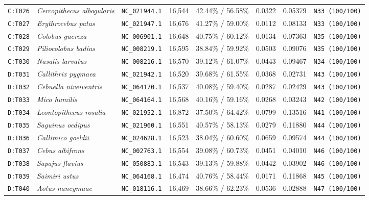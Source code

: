 \documentclass[10pt,letterpaper]{article}
\begin{document}
\begin{longtable}{llllllll}
\texttt{C:T026} & \textit{Cercopithecus albogularis} & \texttt{NC\_021944.1} & 16,544 & 42.44\% / 56.58\% & 0.0322 & 0.05379 & \texttt{N33 (100/100)} \\
\texttt{C:T027} & \textit{Erythrocebus patas} & \texttt{NC\_021947.1} & 16,676 & 41.27\% / 59.00\% & 0.0112 & 0.08133 & \texttt{N33 (100/100)} \\
\texttt{C:T028} & \textit{Colobus guereza} & \texttt{NC\_006901.1} & 16,648 & 40.75\% / 60.12\% & 0.0134 & 0.07363 & \texttt{N35 (100/100)} \\
\texttt{C:T029} & \textit{Piliocolobus badius} & \texttt{NC\_008219.1} & 16,595 & 38.84\% / 59.92\% & 0.0503 & 0.09076 & \texttt{N35 (100/100)} \\
\texttt{C:T030} & \textit{Nasalis larvatus} & \texttt{NC\_008216.1} & 16,570 & 39.12\% / 61.07\% & 0.0443 & 0.09467 & \texttt{N34 (100/100)} \\
\texttt{D:T031} & \textit{Callithrix pygmaea} & \texttt{NC\_021942.1} & 16,520 & 39.68\% / 61.55\% & 0.0368 & 0.02731 & \texttt{N43 (100/100)} \\
\texttt{D:T032} & \textit{Cebuella niveiventris} & \texttt{NC\_064170.1} & 16,537 & 40.08\% / 59.40\% & 0.0287 & 0.02429 & \texttt{N43 (100/100)} \\
\texttt{D:T033} & \textit{Mico humilis} & \texttt{NC\_064164.1} & 16,568 & 40.16\% / 59.16\% & 0.0268 & 0.03243 & \texttt{N42 (100/100)} \\
\texttt{D:T034} & \textit{Leontopithecus rosalia} & \texttt{NC\_021952.1} & 16,872 & 37.50\% / 64.42\% & 0.0799 & 0.13516 & \texttt{N41 (100/100)} \\
\texttt{D:T035} & \textit{Saguinus oedipus} & \texttt{NC\_021960.1} & 16,551 & 40.57\% / 58.13\% & 0.0279 & 0.11880 & \texttt{N44 (100/100)} \\
\texttt{D:T036} & \textit{Callimico goeldii} & \texttt{NC\_024628.1} & 16,523 & 38.04\% / 60.60\% & 0.0659 & 0.09574 & \texttt{N44 (100/100)} \\
\texttt{D:T037} & \textit{Cebus albifrons} & \texttt{NC\_002763.1} & 16,554 & 39.08\% / 60.73\% & 0.0451 & 0.04010 & \texttt{N46 (100/100)} \\
\texttt{D:T038} & \textit{Sapajus flavius} & \texttt{NC\_050883.1} & 16,543 & 39.13\% / 59.88\% & 0.0442 & 0.03902 & \texttt{N46 (100/100)} \\
\texttt{D:T039} & \textit{Saimiri ustus} & \texttt{NC\_064168.1} & 16,474 & 40.76\% / 58.44\% & 0.0171 & 0.11868 & \texttt{N45 (100/100)} \\
\texttt{D:T040} & \textit{Aotus nancymaae} & \texttt{NC\_018116.1} & 16,469 & 38.66\% / 62.23\% & 0.0536 & 0.02888 & \texttt{N47 (100/100)} \\

\end{longtable}
\end{document}
